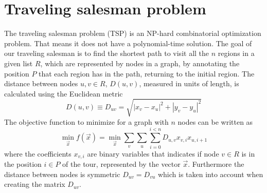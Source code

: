 \section{Traveling salesman problem}
The traveling salesman problem (TSP) is an NP-hard combinatorial optimization problem. That means it does not have a polynomial-time solution. The goal of our traveling salesman is to find the shortest path to visit all the $n$ regions in a given list $R$, which are represented by nodes in a graph, by annotating the position $P$ that each region has in the path, returning to the initial region. The distance between nodes $u,v \in R$, $D(u,v)$, measured in units of length, is calculated using the Euclidean metric
\begin{equation}
    D(u,v) \equiv D_{uv}= \sqrt{\left|x_{v} - x_{u}\right|^{2} + \left|y_{v} - y_{u} \right|^{2}} 
\end{equation}
The objective function to minimize for a graph with $n$ nodes can be written as
\begin{equation}
\label{eq:TSP_noconstraints}
    \min_{\vec{x}} f(\vec{x}) = \min_{\vec{x}} \sum_{v} \sum_{u} \sum_{i=0}^{i<n}D_{u,v}x_{v,i}x_{u, i+1}
\end{equation}
where the coefficients $x_{v,i}$ are binary variables that indicates if node $v \in R$ is in the position $i\in P$ of the tour, represented by the vector $\vec{x}$. Furthermore the distance between nodes is symmetric $D_{uv} = D_{vu}$ which is taken into account when creating the matrix $D_{uv}$.
